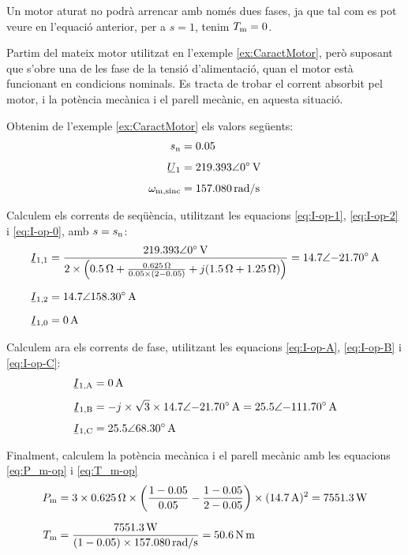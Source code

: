 	    
Un motor aturat no podrà arrencar amb només dues fases, ja que tal com es pot veure en l'equació anterior, per a  $s=1$, tenim $T_\mathrm{m}=0$.	    

	
\begin{exemple}\label{ex:MotorFaseOberta}
\addcontentsxms{\MotorFaseOberta}
	Partim del mateix motor utilitzat en l'exemple \vref{ex:CaractMotor}, però suposant que s'obre una de les fase de la tensió d'alimentació, quan el motor està funcionant en condicions nominals. Es tracta de trobar el corrent absorbit pel motor, i la potència mecànica i el parell mecànic, en aquesta situació.
	
	Obtenim de l'exemple \ref{ex:CaractMotor} els valors següents:
	\begin{align*}
		s\ped{n} &= \num{0,05} \\[1ex]
		\cmplx{U}_1 &=  \complexqty{219,393:0}{V} \\[1ex]
		\omega\ped{m,sinc} &= \qty{157,080}{rad/s}
	\end{align*}

	Calculem els corrents de seqüència, utilitzant les equacions \eqref{eq:I-op-1}, \eqref{eq:I-op-2} i \eqref{eq:I-op-0}, amb $s = s_\mathrm{n}$:
	\begin{align*}
		\cmplx{I}_{1,1} &= \frac{\complexqty{219,393:0}{V}}{2\times \left(\qty{0,5}{\ohm} + \frac{\qty{0,625}{\ohm}}{\num{0,05}\times(2-\num{0,05})} + j (\qty{1,5}{\ohm}+\qty{1,25}{\ohm}) \right)} = \complexqty{14,7:-21,70}{A} \\[1.5ex]
		\cmplx{I}_{1,2}  &=  \complexqty{14,7:158,30}{A} \\[1.5ex]
		\cmplx{I}_{1,0}  &= \qty{0}{A}
	\end{align*}
	
	Calculem ara els corrents de fase, utilitzant les equacions \eqref{eq:I-op-A}, \eqref{eq:I-op-B} i \eqref{eq:I-op-C}:
	\begin{align*}
		\cmplx{I}\ped{1,A} &= \qty{0}{A} \\[1ex]
		\cmplx{I}\ped{1,B}  &=  -j \times\sqrt{3} \times \complexqty{14,7:-21,70}{A} =  \complexqty{25,5:-111,70}{A}  \\[1ex]
		\cmplx{I}\ped{1,C}  &= \complexqty{25,5:68,30}{A}   
	\end{align*}
	
	Finalment, calculem la potència mecànica i el parell mecànic amb les equacions \eqref{eq:P_m-op} i \eqref{eq:T_m-op}
	\begin{align*}
		P_\mathrm{m} &= 3\times \qty{0,625}{\ohm} \times \left(\frac{1-\num{0,05}}{\num{0,05}} - \frac{1-\num{0,05}}{2-\num{0,05}} \right) \times (\qty{14,7}{A})^2  = \qty{7551,3}{W}\\[1.5ex]
		T_\mathrm{m} &= \frac{\qty{7551,3}{W}}{(1-\num{0,05}) \times \qty{157,080}{rad/s}}  = \qty{50,6}{N.m}
	\end{align*}
	

\end{exemple}
